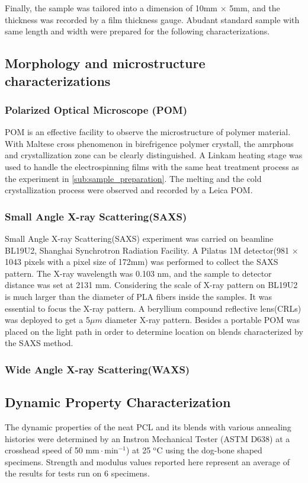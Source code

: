 \documentclass{article}%
\begin{document}
   Finally, the sample was tailored into a dimension of 10mm $\times$ 5mm, and the thickness was recorded by a film thickness gauge.
   Abudant standard sample with same length and width were prepared for the following characterizations.
  \subsection{Morphology and microstructure characterizations} %
  \label{sub:Morphology and microstructure characterizations}
    \subsubsection{Polarized Optical Microscope (POM)}
    POM is an effective facility to observe the microstructure of polymer material. 
    With Maltese cross phenomenon in birefrigence polymer crystall, the amrphous and crystallization zone can be clearly distinguished.
    A Linkam heating stage was used to handle the electrospinning films with the same heat treatment process as the experiment in \autoref{sub:sample_preparation}. The melting and the cold crystallization process were observed and recorded by a Leica POM.
   
    \subsubsection{Small Angle X-ray Scattering(SAXS)}
    Small Angle X-ray Scattering(SAXS) experiment was carried on beamline BL19U2, Shanghai Synchrotron Radiation Facility. 
    A Pilatus 1M detector(981 $\times$ 1043 pixels with a pixel size of 172mm) was performed to collect the SAXS pattern.
    The X-ray wavelength was 0.103 nm, and the sample to detector distance was set at 2131 mm. %
    Considering the scale of X-ray pattern on BL19U2 is much larger than the diameter of PLA fibers inside the samples. 
    It was essential to focus the X-ray pattern.
    A beryllium compound reflective lens(CRLs) was deployed to get a 5$\mu m$ diameter X-ray pattern. 
    Besides a portable POM was placed on the light path in order to determine location on blends characterized by the SAXS method.%


    \subsubsection{Wide Angle X-ray Scattering(WAXS)}
  \subsection{Dynamic Property Characterization} %
  \label{sub:dynamic_property_characterization}
  The dynamic properties of the neat PCL and its blends with various annealing histories were determined by an Instron Mechanical Tester (ASTM D638) at a crosshead speed of 50 $\mathrm{mm\cdot min^{-1}}$) at 25 $\mathrm{^o C}$ using the dog-bone shaped specimens.
  Strength and modulus values reported here represent an average of the results for tests run on 6 specimens.
\end{document}
